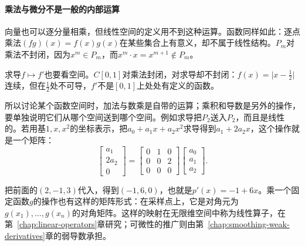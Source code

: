 \paragraph{乘法与微分不是一般的内部运算}
向量也可以逐分量相乘，但线性空间的定义用不到这种运算。函数同样如此：逐点乘法$(fg)(x)=f(x)g(x)$在某些集合上有意义，却不属于线性结构。$P_m$对乘法不封闭，因为$x^m\in P_m$，而$x^m\cdot x=x^{m+1}\notin P_m$。

求导$f\mapsto f'$也要看空间。$C[0,1]$对乘法封闭，对求导却不封闭：$f(x)=\lvert x-\tfrac12\rvert$连续，但在$\tfrac12$处不可导，$f'$不是$[0,1]$上处处有定义的函数。

所以讨论某个函数空间时，加法与数乘是自带的运算；乘积和导数是另外的操作，要单独说明它们从哪个空间送到哪个空间。例如求导把$P_2$送入$P_2$，而且是线性的。若用基$1,x,x^2$的坐标表示，把$a_0+a_1x+a_2x^2$求导得到$a_1+2a_2x$，这个操作就是一个矩阵：
\[
 \begin{bmatrix}a_1\\2a_2\\0\end{bmatrix}
 =\begin{bmatrix}0&1&0\\0&0&2\\0&0&0\end{bmatrix}
 \begin{bmatrix}a_0\\a_1\\a_2\end{bmatrix}.
\]

把前面的$(2,-1,3)$代入，得到$(-1,6,0)$，也就是$p'(x)=-1+6x$。乘一个固定函数$g$的操作也有这样的矩阵形式：在采样点上，它是对角元为$g(x_1),\ldots,g(x_n)$的对角矩阵。这样的映射在无限维空间中称为线性算子，在第~\ref{chap:linear-operators}章研究；可微性的推广则由第~\ref{chap:smoothing-weak-derivatives}章的弱导数承担。
